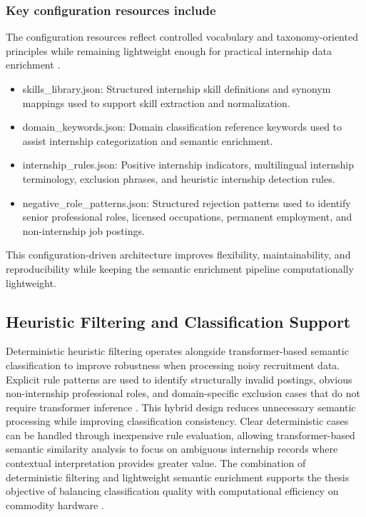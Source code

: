 \subsubsection*{Key configuration resources include}
The configuration resources reflect controlled vocabulary and taxonomy-oriented principles while remaining lightweight enough for practical internship data enrichment \cite{esco2024, peterson2001occupational, senger2024deep}.
\begin{itemize}
\item skills\_library.json: Structured internship skill definitions and synonym mappings used to support skill extraction and normalization.
\item domain\_keywords.json: Domain classification reference keywords used to assist internship categorization and semantic enrichment.
\item internship\_rules.json: Positive internship indicators, multilingual internship terminology, exclusion phrases, and heuristic internship detection rules.
\item negative\_role\_patterns.json: Structured rejection patterns used to identify senior professional roles, licensed occupations, permanent employment, and non-internship job postings.
\end{itemize}
This configuration-driven architecture improves flexibility, maintainability, and reproducibility while keeping the semantic enrichment pipeline computationally lightweight.
\subsection{Heuristic Filtering and Classification Support}
Deterministic heuristic filtering operates alongside transformer-based semantic classification to improve robustness when processing noisy recruitment data. Explicit rule patterns are used to identify structurally invalid postings, obvious non-internship professional roles, and domain-specific exclusion cases that do not require transformer inference \cite{sarawagi2008information, grishman2015information, senger2024deep}.
This hybrid design reduces unnecessary semantic processing while improving classification consistency. Clear deterministic cases can be handled through inexpensive rule evaluation, allowing transformer-based semantic similarity analysis to focus on ambiguous internship records where contextual interpretation provides greater value.
The combination of deterministic filtering and lightweight semantic enrichment supports the thesis objective of balancing classification quality with computational efficiency on commodity hardware \cite{menghani2023efficient, schwartz2020green}.


